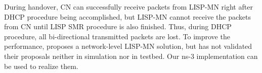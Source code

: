During handover, CN can successfully receive packets from LISP-MN right after DHCP procedure being accomplished, but LISP-MN cannot receive the packets from CN until LISP SMR procedure is also finished. Thus, during DHCP procedure, all bi-directional transmitted packets are lost. To improve the performance, \cite{tang2017lisp} proposes a network-level LISP-MN solution, but has not validated their proposals neither in simulation nor in testbed. Our ns-3 implementation can be used to realize them.









%
%

